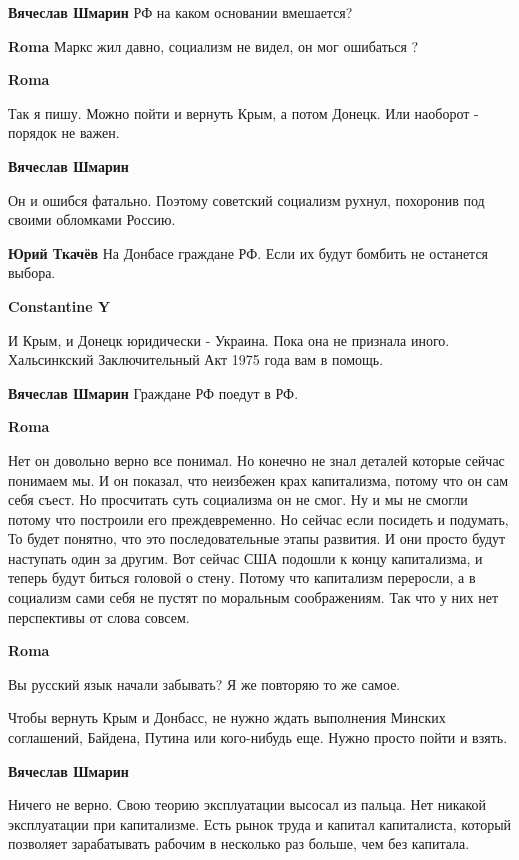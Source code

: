 \begin{itemize}
\textbf{Вячеслав Шмарин}
РФ на каком основании вмешается?

\textbf{Roma}
Маркс жил давно, социализм не видел, он мог ошибаться ?

\textbf{Roma}

Так я пишу. Можно пойти и вернуть Крым, а потом Донецк. Или наоборот - порядок
не важен.

\textbf{Вячеслав Шмарин}

Он и ошибся фатально. Поэтому советский социализм рухнул, похоронив под своими
обломками Россию.

\textbf{Юрий Ткачёв}
На Донбасе граждане РФ. Если их будут бомбить не останется выбора.

\textbf{Constantine Y}

И Крым, и Донецк юридически - Украина. Пока она не признала иного. Хальсинкский
Заключительный Акт 1975 года вам в помощь.

\textbf{Вячеслав Шмарин}
Граждане РФ поедут в РФ.

\textbf{Roma}

Нет он довольно верно все понимал. Но конечно не знал деталей которые сейчас
понимаем мы. И он показал, что неизбежен крах капитализма, потому что он сам
себя съест. Но просчитать суть социализма он не смог. Ну и мы не смогли потому
что построили его преждевременно. Но сейчас если посидеть и подумать, То будет
понятно, что это последовательные этапы развития. И они просто будут наступать
один за другим. Вот сейчас США подошли к концу капитализма, и теперь будут
биться головой о стену. Потому что капитализм переросли, а в социализм сами
себя не пустят по моральным соображениям. Так что у них нет перспективы от
слова совсем.

\textbf{Roma}

Вы русский язык начали забывать? Я же повторяю то же самое. 

Чтобы вернуть Крым и Донбасс, не нужно ждать выполнения Минских соглашений,
Байдена, Путина или кого-нибудь еще. Нужно просто пойти и взять.

\textbf{Вячеслав Шмарин}

Ничего не верно. Свою теорию эксплуатации высосал из пальца. Нет никакой
эксплуатации при капитализме. Есть рынок труда и капитал капиталиста, который
позволяет зарабатывать рабочим в несколько раз больше, чем без капитала.


\end{itemize}

